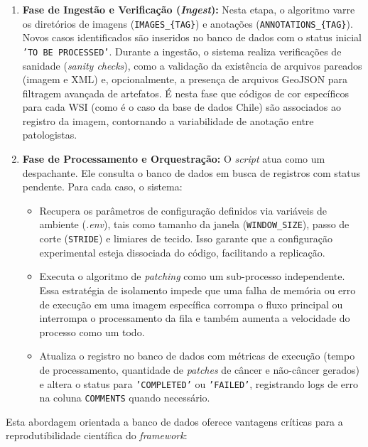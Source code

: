 \begin{enumerate}
    \item \textbf{Fase de Ingestão e Verificação (\textit{Ingest}):} 
    Nesta etapa, o algoritmo varre os diretórios de imagens (\texttt{IMAGES\_\{TAG\}}) e anotações (\texttt{ANNOTATIONS\_\{TAG\}}). Novos casos identificados são inseridos no banco de dados com o status inicial \texttt{'TO BE PROCESSED'}. Durante a ingestão, o sistema realiza verificações de sanidade (\textit{sanity checks}), como a validação da existência de arquivos pareados (imagem e XML) e, opcionalmente, a presença de arquivos GeoJSON para filtragem avançada de artefatos. É nesta fase que códigos de cor específicos para cada WSI (como é o caso da base de dados Chile) são associados ao registro da imagem, contornando a variabilidade de anotação entre patologistas.
    
    \item \textbf{Fase de Processamento e Orquestração:} 
    O \textit{script} atua como um despachante. Ele consulta o banco de dados em busca de registros com status pendente. Para cada caso, o sistema:
    \begin{itemize}
        \item Recupera os parâmetros de configuração definidos via variáveis de ambiente (\textit{.env}), tais como tamanho da janela (\texttt{WINDOW\_SIZE}), passo de corte (\texttt{STRIDE}) e limiares de tecido. Isso garante que a configuração experimental esteja dissociada do código, facilitando a replicação.
        \item Executa o algoritmo de \textit{patching} como um sub-processo independente. Essa estratégia de isolamento impede que uma falha de memória ou erro de execução em uma imagem específica corrompa o fluxo principal ou interrompa o processamento da fila e também aumenta a velocidade do processo como um todo.
        \item Atualiza o registro no banco de dados com métricas de execução (tempo de processamento, quantidade de \textit{patches} de câncer e não-câncer gerados) e altera o status para \texttt{'COMPLETED'} ou \texttt{'FAILED'}, registrando logs de erro na coluna \texttt{COMMENTS} quando necessário.
    \end{itemize}
\end{enumerate}

Esta abordagem orientada a banco de dados oferece vantagens críticas para a reprodutibilidade científica do \textit{framework}:

